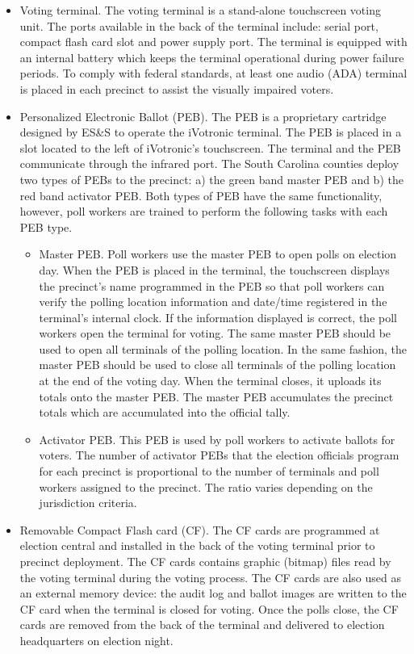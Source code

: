 \documentclass[letterpaper,twocolumn,10pt]{article}
\begin{document}
\begin{itemize} 
\item Voting terminal. The voting terminal is a stand-alone touchscreen voting  unit. The ports available in the back of the terminal include: serial port, compact flash card slot and power supply port. The terminal is equipped with an internal battery which keeps the terminal operational during power failure periods. To comply with federal standards, at least one audio (ADA) terminal is placed in each precinct to assist the visually impaired voters.

\item Personalized Electronic Ballot (PEB). The PEB is a proprietary cartridge designed by ES\&S to operate the iVotronic terminal.  The PEB is placed in a slot located to the left of iVotronic\textquoteright s touchscreen. The terminal and the PEB communicate through the infrared port. The South Carolina counties deploy two types of PEBs to the precinct: a) the green band master PEB and b) the red band activator PEB. Both types of PEB have the same functionality, however, poll workers are trained to perform the following tasks with each PEB type.
    \begin{itemize}
    \item Master PEB.  Poll workers use the master PEB to open polls on election day. When the PEB is placed in the terminal, the touchscreen displays the precinct\textquoteright s name programmed in the PEB so that poll workers can verify the polling location information and date/time registered in the terminal\textquoteright s internal clock. If the information displayed is correct, the poll workers open the terminal for voting. The same master PEB should be used to open all terminals of the polling location. In the same fashion, the master PEB should be used to close all terminals of the polling location at the end of the voting day. When the terminal closes, it uploads  its totals onto the master PEB. The master PEB accumulates the precinct totals which are accumulated into the official tally.
    \item Activator PEB.  This PEB is used by  poll workers to activate ballots for voters. The number of activator PEBs that the election officials program for each precinct is proportional to the number of terminals and poll workers assigned to the precinct. The ratio varies depending on the jurisdiction criteria.
    \end{itemize}
\item Removable Compact Flash card (CF). The CF cards are programmed at election central and installed in the back of the voting terminal prior to precinct deployment. The CF cards contains graphic (bitmap) files read by the voting terminal during the voting process. The CF cards are also used as an external memory device: the audit log and ballot images are written to the CF card when the terminal is closed for voting. Once the polls close, the CF cards are removed from the back of the terminal and delivered to election headquarters on election night. 


\end{itemize}
\end{document}
